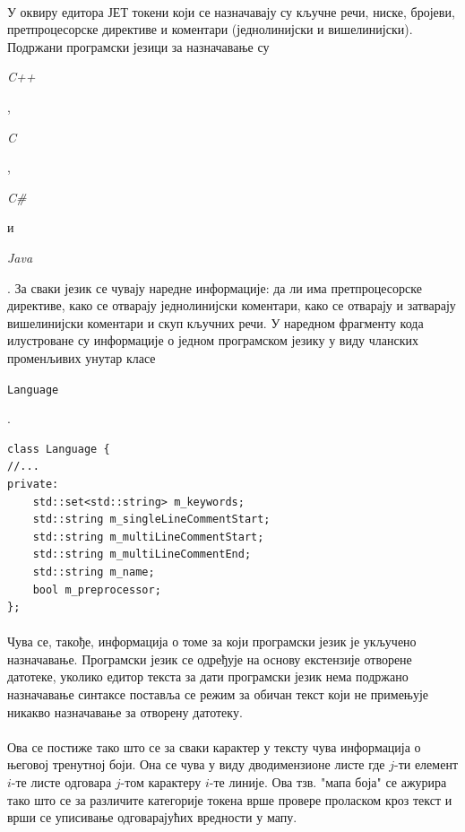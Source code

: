 \documentclass[12pt,oneside]{memoir}
\begin{document}
\paragraph{}
У оквиру едитора ЈЕТ токени који се назначавају су кључне речи, ниске, бројеви, претпроцесорске директиве и коментари (једнолинијски и вишелинијски).
Подржани програмски језици за назначавање су
\begin{latinica}\textit{C++}\end{latinica}, \begin{latinica}\textit{C}\end{latinica},
\begin{latinica}\textit{C\#}\end{latinica} и \begin{latinica}\textit{Java}\end{latinica}. За сваки језик се чувају
наредне информације: да ли има претпроцесорске директиве, како
се отварају једнолинијски коментари, како се отварају и затварају вишелинијски
коментари и скуп кључних речи. У наредном фрагменту кода илустроване су
информације о једном програмском језику у виду чланских променљивих унутар класе \begin{latinica}\verb|Language|\end{latinica}.

\begin{verbatim}
class Language {
//...
private:
	std::set<std::string> m_keywords;
	std::string m_singleLineCommentStart;
	std::string m_multiLineCommentStart;
	std::string m_multiLineCommentEnd;
	std::string m_name;
	bool m_preprocessor;
};
\end{verbatim}

\paragraph{}
Чува се, такође, информација о томе за који програмски језик је укључено
назначавање. Програмски језик се одређује на основу екстензије отворене датотеке, уколико едитор текста за дати програмски језик нема подржано назначавање синтаксе 
поставља се режим за обичан текст који не примењује никакво назначавање
за отворену датотеку.

\paragraph{}
Ова се постиже тако што се за сваки карактер у тексту чува
информација о његовој тренутној боји. Она се чува у виду дводимензионе листе где \(j\)-ти елемент \(i\)-те
листе одговара \(j\)-том карактеру \(i\)-те линије. Ова тзв. "мапа боја" се
ажурира тако што се за различите категорије токена врше провере проласком
кроз текст и врши се уписивање одговарајућих вредности у мапу.
\end{document}
